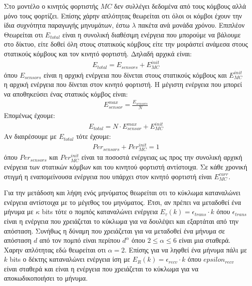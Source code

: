 Στο μοντέλο ο κινητός φορτιστής $MC$ δεν συλλέγει δεδομένα από τους κόμβους αλλά μόνο τους φορτίζει. Επίσης χάρην απλότητας θεωρείται οτι όλοι οι
κόμβοι έχουν την ίδια συχνότητα παραγωγής μηνυμάτων, έστω $\lambda$ πακέτα ανά μονάδα χρόνου. Επιπλέον Θεωρείται οτι $E_{total}$ είναι η συνολική διαθέσιμη ενέργεια
που μπορούμε να βάλουμε στο δίκτυο, είτε δοθεί όλη στους στατικούς κόμβους είτε την μοιράστεί ανάμεσα στους στατικούς κόμβους και τον κινητό φορτιστή. Δηλαδή
αρχικά είναι:
\begin{align}
\label{total}
E_{total} = E_{sensors} + E_{MC}^{init}
\end{align}
όπου $E_{sensors}$ είναι η αρχική ενέργεια που δίνεται στους στατικούς κόμβους και $E_{MC}^{init}$ η αρχική ενέργεια που δίνεται στον κινητό φορτιστή. Η μέγιστη
ενέργεια που μπορεί να αποθηκεύσει ένας στατικός κόμβος είναι:
\begin{align*}
E^{max}_{sensor} = \frac{E_{sensors}}{N}
\end{align*}
Επομένως έχουμε:
\begin{align*}
E_{total} = N \cdot E^{max}_{sensor} + E_{MC}^{init}
\end{align*}
Αν διαιρέσουμε με $E_{total}$ τότε έχουμε:
\begin{align*}
Per_{sensors} + Per_{MC}^{init} = 1
\end{align*}
όπου $Per_{sensors}$ και $Per_{MC}^{init}$ είναι τα ποσοστά ενέργειας ως προς την συνολική αρχική ενέργεια των στατικών κόμβων και του κινητού φορτιστή αντίστοιχα.
Σε κάθε χρονική στιγμή η εναπομείνουσα ενέργεια που υπάρχει στον κινητό φορτιστή είναι $E^{curr}_{MC}$.

Για την μετάδοση και λήψη ενός μηνύματος θεωρείται οτι το κύκλωμα καταναλώνει ενέργεια αντίστοιχα με το μέγεθος του μηνύματος. Έτσι, αν πρέπει να μεταδοθεί ένα
μήνυμα με $κ$ bits τότε ο πομπός καταναλώνει ενέργεια $E_{\tau}(k) = \epsilon_{trans}\cdot k$ όπου $\epsilon_{trans}$ είναι η ενέργεια που
χρειάζεται το κύκλωμα για να δουλέψει και εξαρτάται από την απόσταση. Συνήθως η δύναμη που χρειάζεται για να μεταδοθεί ένα μήνυμα σε απόσταση $d$ από τον πομπό είναι
περίπου $d^{\alpha}$ όπου $2\leq\alpha\leq6$ είναι μια σταθερά. Χαρην απλότητας εδώ θεωρείται οτι $\alpha = 2$. Επίσης για να ληφθεί ένα μήνυμα πάλι με $k$ bits ο
δέκτης καταναλώνει ενέργεια ίση με $E_{R}(k) = \epsilon_{recv}\cdot k$ όπου $epsilon_{recv}$ είναι σταθερά και είναι η ενέργεια που χρειάζεται το κύκλωμα για να
αποκωδικοποιήσει το μήνυμα.

